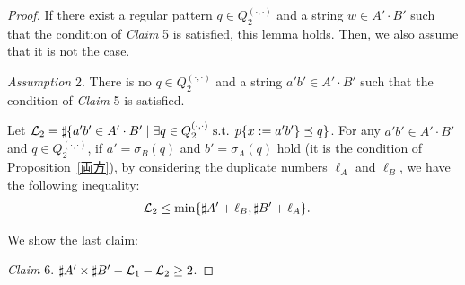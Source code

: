 \begin{proof}
\noindent
If there exist a regular pattern $q \in Q_{2}^{(\cdot,\cdot)}$ and a string $w \in A'\cdot B'$ such that the condition of \textit{Claim} 5 is satisfied, this lemma holds. Then, we also assume that it is not the case.

\smallskip

\noindent
\textit{Assumption} 2.
There is no $q \in Q_{2}^{(\cdot,\cdot)}$ and a string $a'b' \in A'\cdot B'$ such that the condition of \textit{Claim} 5 is satisfied.

\smallskip

\noindent
Let ${\cal L}_{2} = \sharp\{a'b' \in A'\cdot B' \mid \exists q \in Q_{2}^{(\cdot,\cdot)} \mbox{ s.t. } p\{x:=a'b'\} \preceq q\}$.
For any $a'b' \in A'\cdot B'$ and $q \in Q_{2}^{(\cdot,\cdot)}$, if $a' = \sigma_{B}(q)$ and $b' = \sigma_{A}(q)$ hold (it is the condition of Proposition~\ref{両方}), by considering the duplicate numbers $\ell_{A}$ and $\ell_{B}$, we have the following inequality:
\begin{align*}
  {\cal L}_{2} &\leq \min\{\sharp A' + \ell_{B}, \sharp B' + \ell_{A}\}.
\end{align*}

We show the last claim:
  
\smallskip

\noindent
\textit{Claim} 6. 
$\sharp A' \times \sharp B' - {\cal L}_{1} - {\cal L}_{2} \geq 2$.

\smallskip


\end{proof}

